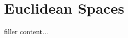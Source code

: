 \documentclass[../../templates/section]{subfiles}
\begin{document}
\section{Euclidean Spaces}\label{sec:euclidean-spaces}

filler content...
\end{document}
